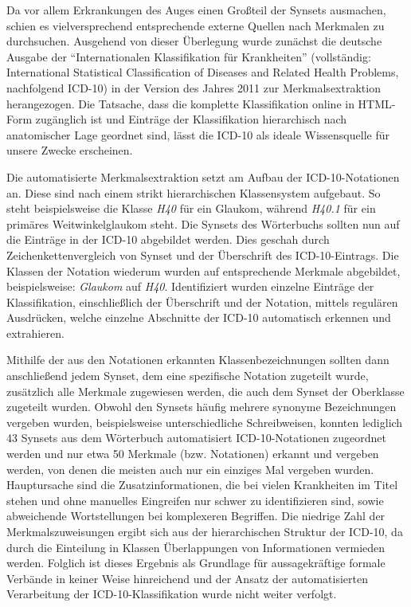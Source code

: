 \documentclass[pagesize,DIV=calc,12pt,final]{scrreprt}
\begin{document}
Da vor allem Erkrankungen des Auges einen Großteil der Synsets ausmachen, schien es vielversprechend entsprechende externe Quellen nach Merkmalen zu durchsuchen. 
Ausgehend von dieser Überlegung wurde zunächst die deutsche Ausgabe der \enquote{Internationalen Klassifikation für Krankheiten} (vollständig: International Statistical Classification of Diseases and Related Health Problems, nachfolgend ICD-10) in der Version des Jahres 2011 zur Merkmalsextraktion herangezogen. 
Die Tatsache, dass die komplette Klassifikation online in HTML-Form zugänglich ist und Einträge der Klassifikation hierarchisch nach anatomischer Lage geordnet sind, lässt die ICD-10 als ideale Wissensquelle für unsere Zwecke erscheinen. 

Die automatisierte Merkmalsextraktion setzt am Aufbau der ICD-10-Notationen an. 
Diese sind nach einem strikt hierarchischen Klassensystem aufgebaut. 
So steht beispielsweise die Klasse \emph{H40} für ein Glaukom, während \emph{H40.1} für ein primäres Weitwinkelglaukom steht. 
Die Synsets des Wörterbuchs sollten nun auf die Einträge in der ICD-10 abgebildet werden. 
Dies geschah durch Zeichenkettenvergleich von Synset und der Überschrift des ICD-10-Eintrags. 
Die Klassen der Notation wiederum wurden auf entsprechende Merkmale abgebildet, beispielsweise: \emph{Glaukom} auf \emph{H40}. 
Identifiziert wurden einzelne Einträge der Klassifikation, einschließlich der Überschrift und der Notation, mittels regulären Ausdrücken, welche einzelne Abschnitte der ICD-10 automatisch erkennen und extrahieren. 

Mithilfe der aus den Notationen erkannten Klassenbezeichnungen sollten dann anschließend jedem Synset, dem eine spezifische Notation zugeteilt wurde, zusätzlich alle Merkmale zugewiesen werden, die auch dem Synset der Oberklasse zugeteilt wurden. 
Obwohl den Synsets häufig mehrere synonyme Bezeichnungen vergeben wurden, beispielsweise unterschiedliche Schreibweisen, konnten lediglich 43 Synsets aus dem Wörterbuch automatisiert ICD-10-Notationen zugeordnet werden und nur etwa 50 Merkmale (bzw. Notationen) erkannt und vergeben werden, von denen die meisten auch nur ein einziges Mal vergeben wurden.  
Hauptursache sind die Zusatzinformationen, die bei vielen Krankheiten im Titel stehen und ohne manuelles Eingreifen nur schwer zu identifizieren sind, sowie abweichende Wortstellungen bei komplexeren Begriffen. 
Die niedrige Zahl der Merkmalszuweisungen ergibt sich aus der hierarchischen Struktur der ICD-10, da durch die Einteilung in Klassen Überlappungen von Informationen vermieden werden. 
Folglich ist dieses Ergebnis als Grundlage für aussagekräftige formale Verbände in keiner Weise hinreichend und der Ansatz der automatisierten Verarbeitung der ICD-10-Klassifikation wurde nicht weiter verfolgt. 
\end{document}
